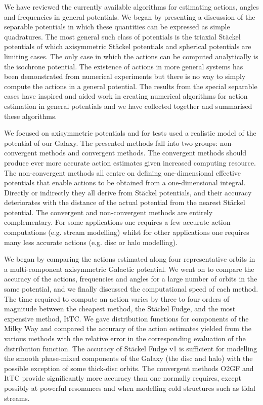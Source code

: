 \documentclass[useAMS,usenatbib,fleqn,a4paper]{mn2e}
\begin{document}
We have reviewed the currently available algorithms for
estimating actions, angles and frequencies in general potentials. We began by presenting a discussion of the separable potentials in which these quantities can be expressed as simple quadratures. The most general such class of potentials is the triaxial St\"ackel potentials of which axisymmetric St\"ackel potentials and spherical potentials are limiting cases. The only case in which the actions can be computed analytically is the isochrone potential. The existence of actions in more general systems has been demonstrated from numerical experiments but there is no way to simply compute the actions in a general potential. The results from the special separable cases have inspired and aided work in creating numerical algorithms for action estimation in general potentials and we have collected together and summarised these algorithms.

We focused
on axisymmetric potentials and for tests used a realistic model of the
potential of our Galaxy. The presented methods fall into two groups: non-convergent
methods and convergent methods.
The convergent methods should produce ever more accurate action estimates
given increased computing resource.
The non-convergent methods all centre on
defining one-dimensional effective potentials that enable actions to be
obtained from a one-dimensional integral. Directly or indirectly they all
derive from St\"ackel potentials, and their accuracy deteriorates with the
distance of the actual potential from the nearest St\"ackel potential.  The
convergent and non-convergent methods are entirely complementary. For some
applications one requires a few accurate action computations (e.g. stream
modelling) whilst for other applications one requires many less accurate
actions (e.g. disc or halo modelling).

We began by comparing the actions estimated along four representative orbits
in a multi-component axisymmetric Galactic potential. We went on to compare
the accuracy of the actions, frequencies and angles for a large number of
orbits in the same potential, and we finally discussed the computational
speed of each method. The time required to compute an action varies by three to four
orders of magnitude between the cheapest method, the St\"ackel Fudge, and the
most expensive method, ItTC.  We gave distribution functions for components of the Milky Way and compared the accuracy of the action estimates yielded from the various methods with the relative error in the corresponding evaluation of the distribution function. The accuracy of
St\"ackel Fudge v1 is sufficient for modelling the smooth phase-mixed components of the Galaxy (the disc and halo) with the possible
exception of some thick-disc orbits. The convergent methods O2GF and
ItTC provide significantly more accuracy than one normally requires,
except possibly at powerful resonances and when modelling cold structures such as tidal streams.
\end{document}
